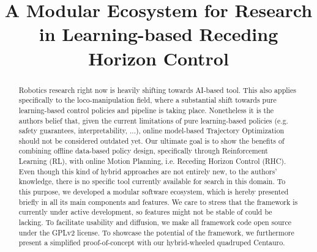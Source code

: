 \documentclass[letterpaper, 10 pt, conference]{ieeeconf}  %
\begin{document}
	
\title{\LARGE \bf
A Modular Ecosystem for Research in Learning-based Receding Horizon Control
}

\author{
}

\maketitle

\begingroup\renewcommand{}
\endgroup

\begingroup\renewcommand{}
\endgroup

\begingroup\renewcommand{}
\endgroup

\setlength{\textfloatsep}{12.0pt plus 8.0pt minus .0pt}

\begin{abstract}
Robotics research right now is heavily shifting towards AI-based tool. This also applies specifically to the loco-manipulation field, where a substantial shift towards pure learning-based control policies and pipeline is taking place. Nonetheless it is the authors belief that, given the current limitations of pure learning-based policies (e.g. safety guarantees, interpretability, ...), online model-based Trajectory Optimization should not be considered outdated yet. Our ultimate goal is to show the benefits of combining offline data-based policy design, specifically through Reinforcement Learning (RL), with online Motion Planning, i.e. Receding Horizon Control (RHC). Even though this kind of hybrid approaches are not entirely new, to the authors' knowledge, there is no specific tool currently available for search in this domain. To this purpose, we developed a modular software ecosystem, which is hereby presented briefly in all its main components and features. We care to stress that the framework is currently under active development, so features might not be stable of could be lacking. To facilitate usability and diffusion, we make all framework code open source under the GPLv2 license. To showcase the potential of the framework, we furthermore present a simplified proof-of-concept with our hybrid-wheeled quadruped Centauro.
\end{abstract}

\IEEEpeerreviewmaketitle











\end{document}
